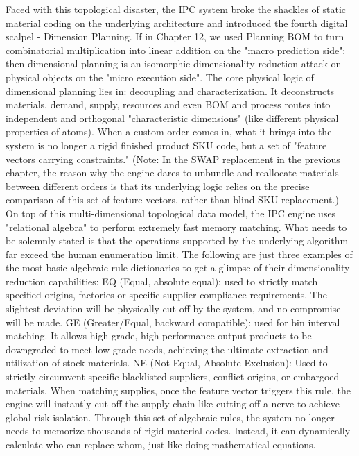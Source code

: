 \documentclass[11pt,a4paper]{article}
\begin{document}
Faced with this topological disaster, the IPC system broke the shackles of static material coding on the underlying architecture and introduced the fourth digital scalpel - Dimension Planning. If in Chapter 12, we used Planning BOM to turn combinatorial multiplication into linear addition on the "macro prediction side"; then dimensional planning is an isomorphic dimensionality reduction attack on physical objects on the "micro execution side". The core physical logic of dimensional planning lies in: decoupling and characterization. It deconstructs materials, demand, supply, resources and even BOM and process routes into independent and orthogonal "characteristic dimensions" (like different physical properties of atoms). When a custom order comes in, what it brings into the system is no longer a rigid finished product SKU code, but a set of "feature vectors carrying constraints." (Note: In the SWAP replacement in the previous chapter, the reason why the engine dares to unbundle and reallocate materials between different orders is that its underlying logic relies on the precise comparison of this set of feature vectors, rather than blind SKU replacement.) On top of this multi-dimensional topological data model, the IPC engine uses "relational algebra" to perform extremely fast memory matching. What needs to be solemnly stated is that the operations supported by the underlying algorithm far exceed the human enumeration limit. The following are just three examples of the most basic algebraic rule dictionaries to get a glimpse of their dimensionality reduction capabilities: EQ (Equal, absolute equal): used to strictly match specified origins, factories or specific supplier compliance requirements. The slightest deviation will be physically cut off by the system, and no compromise will be made. GE (Greater/Equal, backward compatible): used for bin interval matching. It allows high-grade, high-performance output products to be downgraded to meet low-grade needs, achieving the ultimate extraction and utilization of stock materials. NE (Not Equal, Absolute Exclusion): Used to strictly circumvent specific blacklisted suppliers, conflict origins, or embargoed materials. When matching supplies, once the feature vector triggers this rule, the engine will instantly cut off the supply chain like cutting off a nerve to achieve global risk isolation. Through this set of algebraic rules, the system no longer needs to memorize thousands of rigid material codes. Instead, it can dynamically calculate who can replace whom, just like doing mathematical equations.
\end{document}
